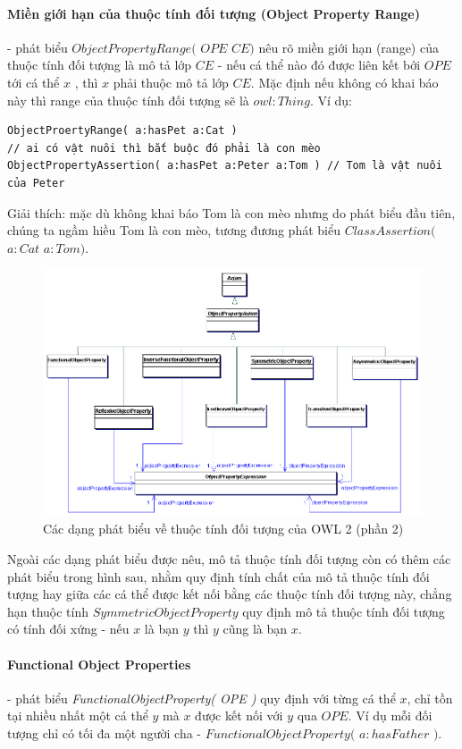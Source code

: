 \paragraph{Miền giới hạn của thuộc tính đối tượng (Object Property Range)} - phát biểu $ObjectPropertyRange($ $OPE$ $CE)$ nêu rõ miền giới hạn (range) của thuộc tính đối tượng là mô tả lớp $CE$ -  nếu cá thể nào đó được liên kết bới $OPE$ tới cá thể $x$ , thì $x$ phải thuộc mô tả lớp $CE$. Mặc định nếu không có khai báo này thì range của thuộc tính đối tượng sẽ là $owl:Thing$. Ví dụ:
\begin{verbatim}
ObjectProertyRange( a:hasPet a:Cat ) 
// ai có vật nuôi thì bắt buộc đó phải là con mèo
ObjectPropertyAssertion( a:hasPet a:Peter a:Tom ) // Tom là vật nuôi của Peter
\end{verbatim}
Giải thích: mặc dù không khai báo Tom là con mèo nhưng do phát biểu đầu tiên, chúng ta ngầm hiều Tom là con mèo, tương đương phát biểu $ClassAssertion($ $a:Cat$ $a:Tom)$.
\\
\begin{figure}[h]
	\centering
	\includegraphics[width=120mm]{Figures/objectpropertyAxiom1.png}
	\caption{Các dạng phát biểu về thuộc tính đối tượng của OWL 2 (phần 2) \label{overflow}}
\end{figure}
Ngoài các dạng phát biểu được nêu, mô tả thuộc tính đối tượng còn có thêm các phát biểu trong hình sau, nhằm quy định tính chất của mô tả thuộc tính đối tượng hay giữa các cá thể được kết nối bằng các thuộc tính đối tượng này, chẳng hạn thuộc tính $SymmetricObjectProperty$ quy định mô tả thuộc tính đối tượng có tính đối xứng - nếu $x$ là bạn $y$ thì $y$ cũng là bạn $x$. 

\paragraph{Functional Object Properties} - phát biểu \textit{FunctionalObjectProperty( OPE )} quy định với từng cá thể $x$, chỉ tồn tại nhiều nhất một cá thể $y$ mà $x$ được kết nối với $y$ qua $OPE$. Ví dụ mỗi đối tượng chỉ có tối đa một người cha - $FunctionalObjectProperty($ $a:hasFather$ $)$. 

